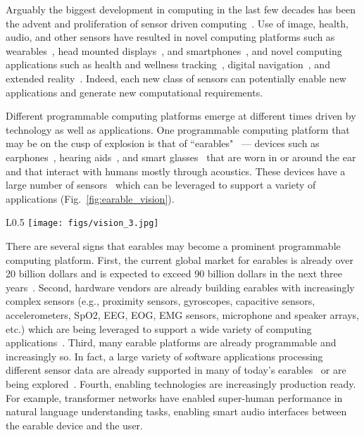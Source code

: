 Arguably the biggest development in computing in the last few decades has been
the advent and proliferation of sensor driven
computing~\cite{krishnamurthi_overview_2020}.  Use of image, health, audio, and
other sensors have resulted in novel computing platforms such as
wearables~\cite{shamma2007watch}, head mounted
displays~\cite{jensen2018review}, and smartphones~\cite{smith2013smartphone},
and novel computing applications such as health and wellness
tracking~\cite{alslaity2022mobile}, digital navigation~\cite{vvcelak2005amr},
and extended reality~\cite{huzaifa2020exploring}. Indeed, each new class of
sensors can potentially enable new applications and generate new computational
requirements.

Different programmable computing platforms emerge at different times driven by
technology as well as applications. One programmable computing platform that
may be on the cusp of explosion is that of ``earables"~\cite{rethink} ---
devices such as earphones~\cite{boseearbuds, bosesports, sonyxm3}, hearing
aids~\cite{eargoneo}, and smart glasses~\cite{boseframe, amazonframe} that are
worn in or around the ear and that interact with humans mostly through
acoustics.  These devices have a large number of sensors~\cite{sensorsinear}
which can be leveraged to support a variety of applications
(Fig.~\ref{fig:earable_vision}).

\begin{wrapfigure}{L}{0.5\textwidth}
    \centering
    \texttt{[image: figs/vision\_3.jpg]}
    \caption{\small
        Emerging earable devices will be programmable platforms with a rich set
        of sensors and will support a variety of applications.
    }
    \label{fig:earable_vision}
\end{wrapfigure}

There are several signs that earables may become a prominent programmable
computing platform.  First, the current global market for earables is already
over 20 billion dollars and is expected to exceed 90 billion dollars in the
next three years~\cite{market}. Second, hardware vendors are already building
earables with increasingly complex sensors (e.g., proximity sensors,
gyroscopes, capacitive sensors, accelerometers, SpO2, EEG, EOG, EMG sensors,
microphone and speaker arrays, etc.) which are being leveraged to support a
wide variety of computing applications~\cite{jabra, earableai, airpodsmax}.
Third, many earable platforms are already programmable and increasingly so.  In
fact, a large variety of software applications processing different sensor data
are already supported in many of today's earables~\cite{jabra, earableai,
airpodsmax} or are being explored~\cite{aptx, mute, petersn, earar}.  Fourth,
enabling technologies are increasingly production ready.  For example,
transformer networks have enabled super-human performance in natural language
understanding tasks, enabling smart audio interfaces between the earable device
and the user.

